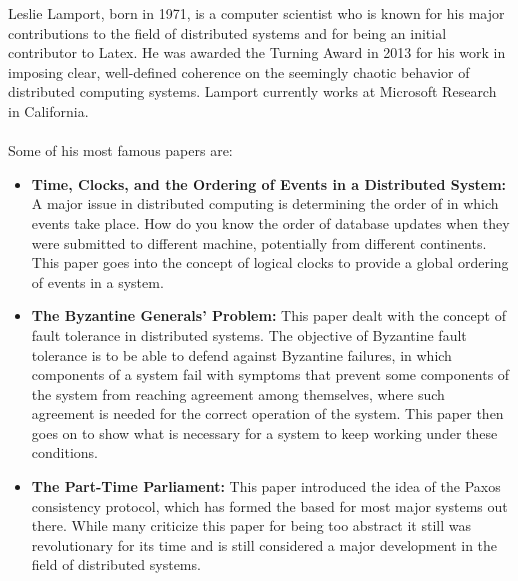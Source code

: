 \documentclass[9pt]{extarticle} %
\begin{document}
\begin{minipage}[t]{.61\linewidth} %
\vspace{-0.4cm}
\hypertarget{firstnews}{}
	
	Leslie Lamport, born in 1971, is a computer scientist who is known
	for his major contributions to the field of distributed systems and
	for being an initial contributor to Latex. He was awarded the Turning
	Award in 2013 for his work in imposing clear, well-defined coherence
	on  the seemingly chaotic behavior of distributed computing systems. 
	Lamport currently works at Microsoft Research in California.\\
	\\
	Some of his most famous papers are:
	\begin{itemize}
	\item \textbf{Time, Clocks, and the Ordering of Events in a 
	Distributed System:} A major issue in distributed computing is 
	determining the order of in which events take place.
	How do you know the order of database updates when they were 
	submitted to different machine, potentially from different 
	continents. This paper goes into the concept of logical clocks
	to provide a global ordering of events in a system.
	\\
	\item \textbf{The Byzantine Generals' Problem:} This paper dealt
	with the concept of fault tolerance in distributed systems. The
	objective of Byzantine fault tolerance is to be able to defend 
	against Byzantine failures, in which components of a system fail
	with symptoms that prevent some components of the system from 
	reaching agreement among themselves, where such agreement is needed
	for the correct operation of the system. This paper then goes on
	to show what is necessary for a system to keep working under these
	conditions.
	\\
	\item \textbf{The Part-Time Parliament:}
	This paper introduced the idea of the Paxos consistency protocol, 
	which has formed the based for most major systems out there. While
	many criticize this paper for being too abstract it still was
	revolutionary for its time and is still considered a major development
	in the field of distributed systems.
	\end{itemize}
	


\end{minipage}
\end{document}
